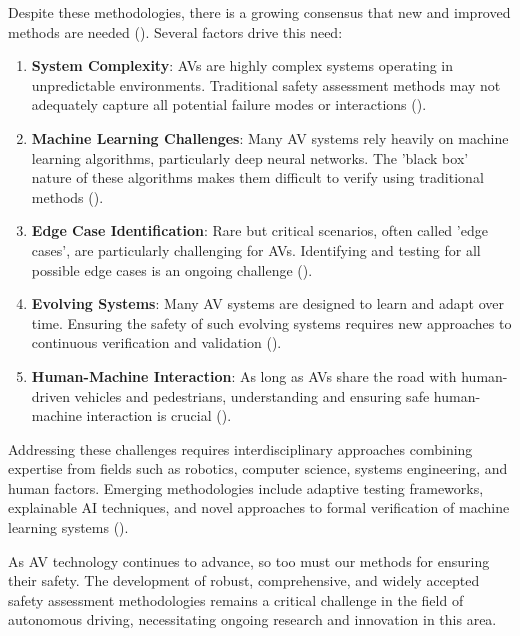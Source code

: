 Despite these methodologies, there is a growing consensus that new and improved methods are needed (\cite{Koopman2019}). Several factors drive this need:

\begin{enumerate}
    \item \textbf{System Complexity}: AVs are highly complex systems operating in unpredictable environments. Traditional safety assessment methods may not adequately capture all potential failure modes or interactions (\cite{Burton2017}).
    
    \item \textbf{Machine Learning Challenges}: Many AV systems rely heavily on machine learning algorithms, particularly deep neural networks. The 'black box' nature of these algorithms makes them difficult to verify using traditional methods (\cite{Salay2019}).
    
    \item \textbf{Edge Case Identification}: Rare but critical scenarios, often called 'edge cases', are particularly challenging for AVs. Identifying and testing for all possible edge cases is an ongoing challenge (\cite{Koopman2016}).
    
    \item \textbf{Evolving Systems}: Many AV systems are designed to learn and adapt over time. Ensuring the safety of such evolving systems requires new approaches to continuous verification and validation (\cite{Seshia2016}).
    
    \item \textbf{Human-Machine Interaction}: As long as AVs share the road with human-driven vehicles and pedestrians, understanding and ensuring safe human-machine interaction is crucial (\cite{Vinkhuyzen2018}).
\end{enumerate}

Addressing these challenges requires interdisciplinary approaches combining expertise from fields such as robotics, computer science, systems engineering, and human factors. Emerging methodologies include adaptive testing frameworks, explainable AI techniques, and novel approaches to formal verification of machine learning systems (\cite{Seshia2016}).

As AV technology continues to advance, so too must our methods for ensuring their safety. The development of robust, comprehensive, and widely accepted safety assessment methodologies remains a critical challenge in the field of autonomous driving, necessitating ongoing research and innovation in this area.

